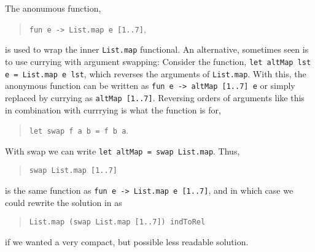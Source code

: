 \documentclass[fsharpNotes.tex]{subfiles}
\begin{document}
\begin{comment}
As an example, consider the list of string-concatenations of every combination of \lstinline{["a","b"]} and \lstinline{["1"; "2"; "3"]}, i.e., \lstinline{["a1"; "a2"; "a3"; "b1"; "b2"; "b3"]}. For the first element in the letter-list, this can be hard-coded as
\begin{quote}
\lstinline{List.map (fun d -> "a"+d) ["1"; "2"; "3"]},
\end{quote}
which produces \lstinline{["a1"; "a2"; "a3"]}. Using an outer \lstinline{List.map} iterating over all letters looks like:
\begin{quote}
\lstinline{List.map (fun l -> List.map (fun d -> l+d) ["1";"2";"3"]) ["a"; "b"]},
\end{quote}
which produces \lstinline{[a1"; a2"; "a3"; "b1"; "b2"; "b3"]}.

The code for \lstinline{candidateRelativeMoves}, shown in \Cref{pieces}, is similar in spirit to the letter and digit example above, but is further complicated by the fact that \lstinline{indToRel} is a list of functions.
\end{comment}
%
%
The anonumous function,
\begin{quote}
\lstinline{fun e -> List.map e [1..7]},
\end{quote}
is used to wrap the inner \lstinline{List.map} functional. An alternative, sometimes seen is to use currying with argument swapping: Consider the function, \lstinline{let altMap lst e = List.map e lst}, which reverses the arguments of \lstinline{List.map}. With this, the anonymous function can be written as \lstinline{fun e -> altMap [1..7] e} or simply replaced by currying as \lstinline{altMap [1..7]}. Reversing orders of arguments like this in combination with currrying is what the  function is for,
\begin{quote}
\lstinline{let swap f a b = f b a}.
\end{quote}
With swap we can write \lstinline{let altMap = swap List.map}. Thus,
\begin{quote}
\lstinline{swap List.map [1..7]}
\end{quote}
is the same function as \lstinline{fun e -> List.map e [1..7]}, and in which case we could rewrite the solution in  as
\begin{quote}
\lstinline{List.map (swap List.map [1..7]) indToRel}
\end{quote}
if we wanted a very compact, but possible less readable solution.
\end{document}

